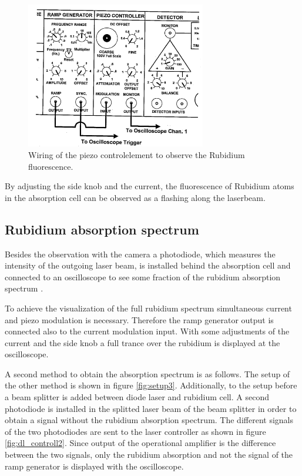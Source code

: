 \begin{figure}
  \centering
  \includegraphics[width=0.7\textwidth]{wiring.png}
  \caption{Wiring of the piezo controlelement to observe the Rubidium fluorescence.\cite{V60}}
  \label{fig:dl_controll}
\end{figure}

By adjusting the side knob and the current,
the fluorescence of Rubidium atoms in the absorption cell
can be observed
as a  flashing along the laserbeam.

\subsection{Rubidium absorption spectrum}
\label{subsec:rubidium_absorption spectrum}

Besides the observation with the camera a photodiode,
which measures the intensity
of the outgoing laser beam,
is installed behind the absorption cell and
connected to an oscilloscope to
see some fraction of the rubidium absorption spectrum .

To achieve the visualization of the full rubidium
spectrum
simultaneous current and piezo modulation
is necessary. Therefore the ramp generator output
is connected also to the current modulation input.
With some adjustments of the current and the side knob
a full trance over the rubidium is displayed at the oscilloscope.

A second method to obtain the absorption spectrum
is as follows.
The setup of the other method is shown in
figure \ref{fig:setup3}.
Additionally, to the setup before a beam splitter is added
between diode laser and rubidium cell.
A second photodiode is installed in the splitted laser beam of the beam splitter
in order to obtain a signal without the rubidium absorption spectrum.
The different signals of the two photodiodes are sent to the
laser controller as shown in figure \ref{fig:dl_controll2}.
Since output of the operational amplifier is
the  difference between the two signals,
only the rubidium absorption and not the signal of the ramp generator is
displayed with the oscilloscope.

